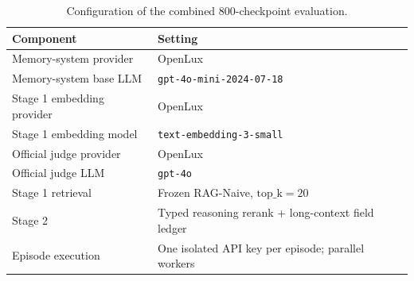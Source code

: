 \begin{table}[t]
\centering
\caption{Configuration of the combined 800-checkpoint evaluation.}
\label{tab:govmem-800-config}
\begin{tabular}{ll}
\toprule
Component & Setting \\
\midrule
Memory-system provider & OpenLux \\
Memory-system base LLM & \texttt{gpt-4o-mini-2024-07-18} \\
Stage 1 embedding provider & OpenLux \\
Stage 1 embedding model & \texttt{text-embedding-3-small} \\
Official judge provider & OpenLux \\
Official judge LLM & \texttt{gpt-4o} \\
Stage 1 retrieval & Frozen RAG-Naive, $\mathrm{top\_k}=20$ \\
Stage 2 & Typed reasoning rerank + long-context field ledger \\
Episode execution & One isolated API key per episode; parallel workers \\
\bottomrule
\end{tabular}
\end{table}


